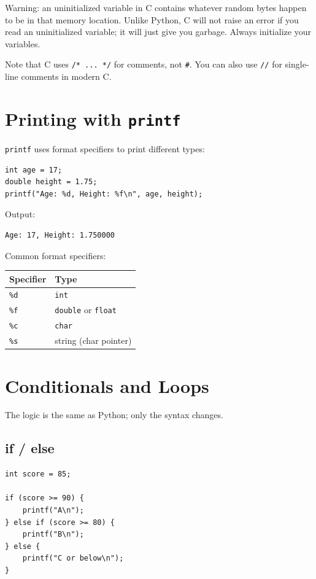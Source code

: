 Warning: an uninitialized variable in C contains whatever random bytes
happen to be in that memory location.  Unlike Python, C will not raise
an error if you read an uninitialized variable; it will just give you
garbage.  Always initialize your variables.

Note that C uses \texttt{/* ... */} for comments, not \texttt{\#}.
You can also use \texttt{//} for single-line comments in modern C.

\section{Printing with \texttt{printf}}

\texttt{printf} uses format specifiers to print different types:

\begin{verbatim}
int age = 17;
double height = 1.75;
printf("Age: %d, Height: %f\n", age, height);
\end{verbatim}

Output:
\begin{verbatim}
Age: 17, Height: 1.750000
\end{verbatim}

Common format specifiers:

\begin{center}
\begin{tabular}{ll}
\hline
\textbf{Specifier} & \textbf{Type} \\
\hline
\texttt{\%d}  & \texttt{int} \\
\texttt{\%f}  & \texttt{double} or \texttt{float} \\
\texttt{\%c}  & \texttt{char} \\
\texttt{\%s}  & string (char pointer) \\
\hline
\end{tabular}
\end{center}

\section{Conditionals and Loops}

The logic is the same as Python; only the syntax changes.

\subsection{if / else}

\begin{verbatim}
int score = 85;

if (score >= 90) {
    printf("A\n");
} else if (score >= 80) {
    printf("B\n");
} else {
    printf("C or below\n");
}
\end{verbatim}

